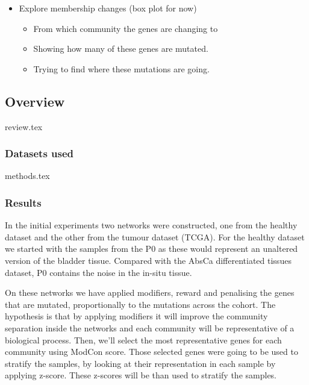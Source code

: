 \begin{itemize}
    \item Explore membership changes (box plot \- for now)
          \begin{itemize}
              \item From which community the genes are changing to
              \item Showing how many of these genes are mutated.
              \item Trying to find where these mutations are going.
          \end{itemize}
\end{itemize}


\subsection{Overview}


{review.tex}


\subsubsection{Datasets used}


{methods.tex}


\subsubsection{Results}

In the initial experiments two networks were constructed, one from the healthy dataset and the other from the tumour dataset (TCGA). For the healthy dataset we started with the samples from the P0 as these would represent an unaltered version of the bladder tissue. Compared with the AbsCa differentiated tissues dataset, P0 contains the noise in the in-situ tissue.

On these networks we have applied modifiers, reward and penalising the genes that are mutated, proportionally to the mutations across the cohort. The hypothesis is that by applying modifiers it will improve the community separation inside the networks and each community will be representative of a biological process. Then, we'll select the most representative genes for each community using ModCon score. Those selected genes were going to be used to stratify the samples, by looking at their representation in each sample by applying z-score. These z-scores will be than used to stratify the samples.

